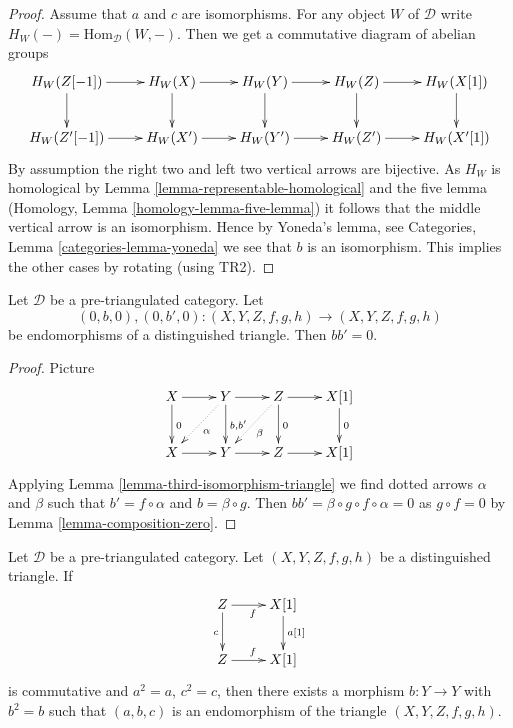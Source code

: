 \begin{proof}
Assume that $a$ and $c$ are isomorphisms.
For any object $W$ of $\mathcal{D}$ write
$H_W( - ) = \text{Hom}_{\mathcal{D}}(W, -)$.
Then we get a commutative diagram of abelian groups
$$
\xymatrix{
H_W(Z[-1]) \ar[r] \ar[d] &
H_W(X) \ar[r] \ar[d] &
H_W(Y) \ar[r] \ar[d] &
H_W(Z) \ar[r] \ar[d] &
H_W(X[1]) \ar[d] \\
H_W(Z'[-1]) \ar[r] &
H_W(X') \ar[r] &
H_W(Y') \ar[r] &
H_W(Z') \ar[r] &
H_W(X'[1])
}
$$
By assumption the right two and left two vertical arrows are bijective.
As $H_W$ is homological by
Lemma \ref{lemma-representable-homological}
and the five lemma
(Homology, Lemma \ref{homology-lemma-five-lemma})
it follows that the middle vertical arrow is an isomorphism.
Hence by Yoneda's lemma, see
Categories, Lemma \ref{categories-lemma-yoneda}
we see that $b$ is an isomorphism.
This implies the other cases by rotating (using TR2).
\end{proof}

\begin{lemma}
\label{lemma-third-map-square-zero}
Let $\mathcal{D}$ be a pre-triangulated category.
Let
$$
(0, b, 0), (0, b', 0) : (X, Y, Z, f, g, h) \to (X, Y, Z, f, g, h)
$$
be endomorphisms of a distinguished triangle. Then $bb' = 0$.
\end{lemma}

\begin{proof}
Picture
$$
\xymatrix{
X \ar[r] \ar[d]^0 &
Y \ar[r] \ar[d]^{b, b'} \ar@{..>}[ld]^\alpha &
Z \ar[r] \ar[d]^0 \ar@{..>}[ld]^\beta &
X[1] \ar[d]^0 \\
X \ar[r] & Y \ar[r] & Z \ar[r] & X[1]
}
$$
Applying
Lemma \ref{lemma-third-isomorphism-triangle}
we find dotted arrows $\alpha$ and $\beta$ such that
$b' = f \circ \alpha$ and $b = \beta \circ g$. Then
$bb' = \beta \circ g \circ f \circ \alpha = 0$
as $g \circ f = 0$ by
Lemma \ref{lemma-composition-zero}.
\end{proof}

\begin{lemma}
\label{lemma-third-map-idempotent}
Let $\mathcal{D}$ be a pre-triangulated category.
Let $(X, Y, Z, f, g, h)$ be a distinguished triangle.
If
$$
\xymatrix{
Z \ar[r]_f \ar[d]_c & X[1] \ar[d]^{a[1]} \\
Z \ar[r]^f & X[1]
}
$$
is commutative and $a^2 = a$, $c^2 = c$, then there exists a
morphism $b : Y \to Y$ with $b^2 = b$ such that
$(a, b, c)$ is an endomorphism of the triangle $(X, Y, Z, f, g, h)$.
\end{lemma}

